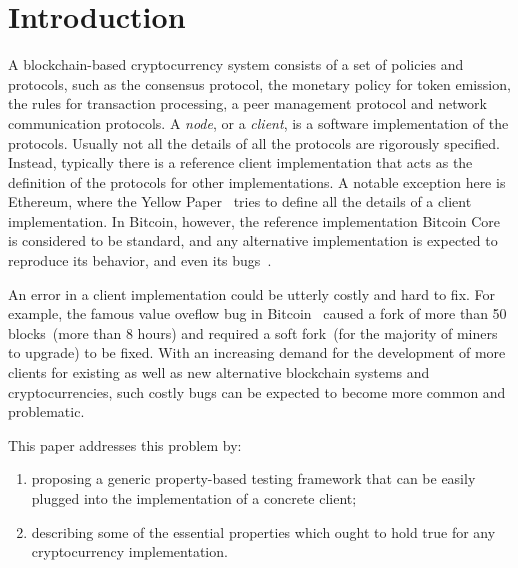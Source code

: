 
\section{Introduction}

A blockchain-based cryptocurrency system consists of a set of policies and protocols, such as the consensus protocol, the monetary policy for token emission, the rules for transaction processing, a peer management protocol and network communication protocols. A \emph{node}, or a {\em client}, is a software implementation of the protocols. Usually not all the details of all the protocols are rigorously specified. Instead, typically there is a reference client implementation that acts as the  definition of the protocols for other implementations. A notable exception here is Ethereum, where the Yellow Paper~\cite{ethyp} tries to define all the details of a client implementation. In Bitcoin, however, the reference implementation Bitcoin Core is considered to be standard, and any alternative implementation is expected to reproduce its behavior, and even its bugs~\cite{bitbugs}.

An error in a client implementation could be utterly costly and hard to fix. For example, the famous value oveflow bug in Bitcoin~\cite{overflow} caused a fork of more than 50 blocks~(more than 8 hours) and required a soft fork~(for the majority of miners to upgrade) to be fixed. With an increasing demand for the development of more clients for existing as well as new alternative blockchain systems and cryptocurrencies, such costly bugs can be expected to become more common and problematic. 

This paper addresses this problem by:
\begin{enumerate}
\item proposing a generic property-based testing framework that can be easily plugged into the implementation of a concrete client;
\item describing some of the essential properties which ought to hold true for any cryptocurrency implementation.
\end{enumerate}

